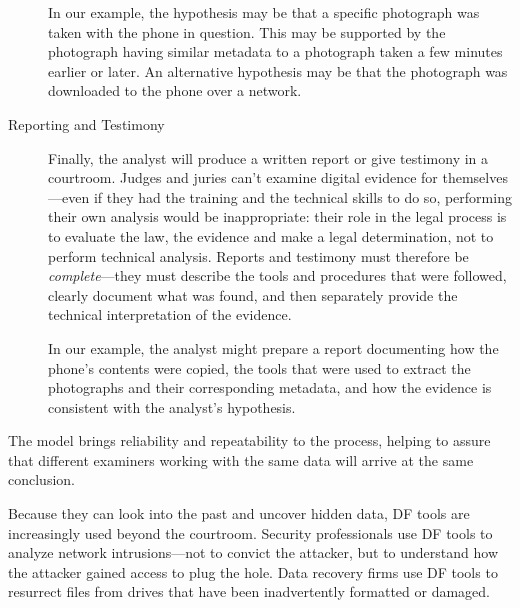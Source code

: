 \begin{description}
  In our example, the hypothesis may be that a specific photograph was
  taken with the phone in question. This may be supported by the
  photograph having similar metadata to a photograph taken a few
  minutes earlier or later. An alternative hypothesis may be that the
  photograph was downloaded to the phone over a network.

\item[Reporting and Testimony] Finally, the analyst will
  produce a written report or give testimony in a courtroom.
  Judges and juries can't examine digital evidence for
  themselves---even if they had the training and the technical skills
  to do so, performing their own analysis would be inappropriate:
  their role in the legal process is to evaluate the law, the evidence
  and make a legal determination, not to perform technical
  analysis. Reports and testimony must therefore be 
  \emph{complete}---they must describe the tools and procedures
  that were followed, clearly document what was found, and then
  separately provide the technical interpretation of the
  evidence. 

  In our example, the analyst might prepare a report documenting how
  the phone's contents were copied, the tools that were used to
  extract the photographs and their corresponding metadata, and how
  the evidence is consistent with the analyst's hypothesis. 

\end{description}

The model brings reliability and repeatability to the process, helping
to assure that different examiners working with the same data will
arrive at the same conclusion. 

Because they can look into the past and uncover hidden data, DF tools
are increasingly used beyond the courtroom. Security professionals use
DF tools to analyze network intrusions---not to convict the attacker,
but to understand how the attacker gained access to plug the
hole. Data recovery firms use DF tools to resurrect files from drives
that have been inadvertently formatted or damaged. 

